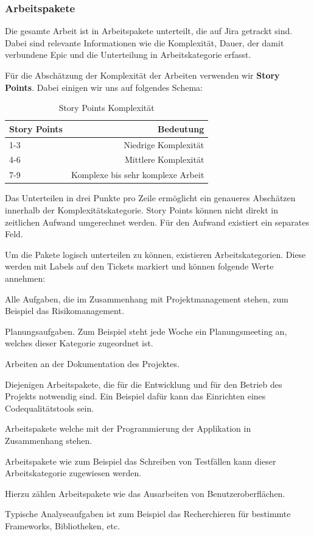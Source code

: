 \subsubsection*{Arbeitspakete}
Die gesamte Arbeit ist in Arbeitspakete unterteilt, die auf Jira getrackt sind. Dabei sind relevante Informationen wie die Komplexität, Dauer, der damit verbundene Epic und die Unterteilung in Arbeitskategorie erfasst.

Für die Abschätzung der Komplexität der Arbeiten verwenden wir \textbf{Story Points}. Dabei einigen wir uns auf folgendes Schema:

\renewcommand{\arraystretch}{1.5}
\begin{table}[h]
	\centering
	\begin{tabular}{| l | r |}
		\hline
		\textbf{Story Points} & \textbf{Bedeutung}\\
		\hline
		1-3 & Niedrige Komplexität \\
		4-6 & Mittlere Komplexität \\
		7-9 & Komplexe bis sehr komplexe Arbeit\\
		\hline
	\end{tabular}
	\caption[Story-Points]{Story Points Komplexität}
	\label{tab:story-points}
\end{table}

Das Unterteilen in drei Punkte pro Zeile ermöglicht ein genaueres Abschätzen innerhalb der Komplexitätskategorie. Story Points können nicht direkt in zeitlichen Aufwand umgerechnet werden. Für den Aufwand existiert ein separates Feld.

Um die Pakete logisch unterteilen zu können, existieren Arbeitskategorien. Diese werden mit Labels auf den Tickets markiert und können folgende Werte annehmen:
\begin{description}[leftmargin=!,labelwidth=\widthof{\bfseries ProjektManagement}]
	\item[ProjektManagement] Alle Aufgaben, die im Zusammenhang mit Projektmanagement stehen, zum Beispiel das Risikomanagement.
	\item[Planung] Planungsaufgaben. Zum Beispiel steht jede Woche ein Planungsmeeting an, welches dieser Kategorie zugeordnet ist.
	\item[Dokumentation] Arbeiten an der Dokumentation des Projektes.
	\item[Infrastruktur] Diejenigen Arbeitspakete, die für die Entwicklung und für den Betrieb des Projekts notwendig sind. Ein Beispiel dafür kann das Einrichten eines Codequalitätstools sein. 
	\item[Entwicklung] Arbeitspakete welche mit der Programmierung der Applikation in Zusammenhang stehen.
	\item[Testing] Arbeitspakete wie zum Beispiel das Schreiben von Testfällen kann dieser Arbeitskategorie zugewiesen werden.
	\item[Design] Hierzu zählen Arbeitspakete wie das Ausarbeiten von Benutzeroberflächen.
	\item[Analyse] Typische Analyseaufgaben ist zum Beispiel das Recherchieren für bestimmte Frameworks, Bibliotheken, etc. 
\end{description}

